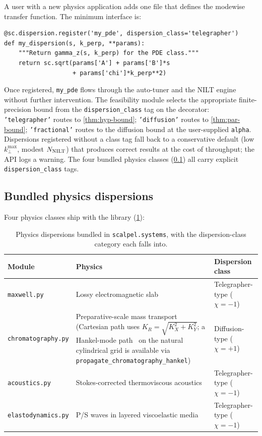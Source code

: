 \documentclass[manuscript,review]{acmart}
\newcommand{\kpmax}[1][]{k_\perp^{\max#1}}
\newcommand{\sigsp}{\chi}
\begin{document}
A user with a new physics application adds one file that defines the
modewise transfer function. The minimum interface is:

\begin{lstlisting}[style=pythonstyle]
@sc.dispersion.register('my_pde', dispersion_class='telegrapher')
def my_dispersion(s, k_perp, **params):
    """Return gamma_z(s, k_perp) for the PDE class."""
    return sc.sqrt(params['A'] + params['B']*s
                   + params['chi']*k_perp**2)
\end{lstlisting}

Once registered, \texttt{my\_pde} flows through the auto-tuner and
the NILT engine without further intervention. The feasibility module
selects the appropriate finite-precision bound from the
\texttt{dispersion\_class} tag on the decorator: \texttt{'telegrapher'}
routes to \cref{thm:hyp-bound}; \texttt{'diffusion'} routes to
\cref{thm:par-bound}; \texttt{'fractional'} routes to the diffusion
bound at the user-supplied \texttt{alpha}. Dispersions registered
without a class tag fall back to a conservative default (low $\kpmax$,
modest $N_{\rm NILT}$) that produces correct results at the cost of
throughput; the API logs a warning. The four bundled physics
classes (\cref{sec:bundled-physics}) all carry explicit
\texttt{dispersion\_class} tags.

\subsection{Bundled physics dispersions}\label{sec:bundled-physics}

Four physics classes ship with the library
(\cref{tab:bundled-classes}):

\begin{table}[h]
\centering
\small
\caption{Physics dispersions bundled in
\texttt{scalpel.systems}, with the dispersion-class category each
falls into.}
\label{tab:bundled-classes}
\begin{tabular}{lll}
\toprule
Module & Physics & Dispersion class \\
\midrule
\texttt{maxwell.py} & Lossy electromagnetic slab & Telegrapher-type ($\sigsp = -1$) \\
\texttt{chromatography.py} & Preparative-scale mass transport (Cartesian path uses $K_R = \sqrt{K_X^2 + K_Y^2}$; a Hankel-mode path~\cite{guizar2004} on the natural cylindrical grid is available via \texttt{propagate\_chromatography\_hankel}) & Diffusion-type ($\sigsp = +1$) \\
\texttt{acoustics.py} & Stokes-corrected thermoviscous acoustics & Telegrapher-type ($\sigsp = -1$) \\
\texttt{elastodynamics.py} & P/S waves in layered viscoelastic media & Telegrapher-type ($\sigsp = -1$) \\
\bottomrule
\end{tabular}
\end{table}
\end{document}
